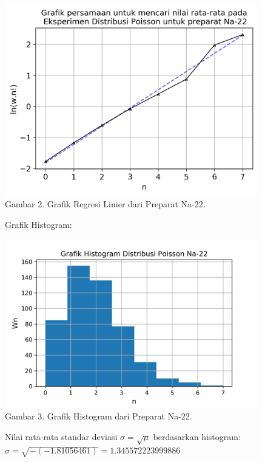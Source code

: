\documentclass{article}
\begin{document}
			\begin{center}
				\includegraphics[width=110mm]{Data/Na-22-Graph.png}\\
				Gambar 2. Grafik Regresi Linier dari Preparat Na-22.
			\end{center}
			Grafik Histogram:
			\begin{center}
				\includegraphics[width=110mm]{Data/Na-22.png}\\
				Gambar 3. Grafik Histogram dari Preparat Na-22.
			\end{center}
			Nilai rata-rata standar deviasi $\sigma = \sqrt{\mu}$ berdasarkan histogram:\\
			$\sigma = \sqrt{-(-1.81056461)} = 1.345572223999886$ \newpage
			
\end{document}
